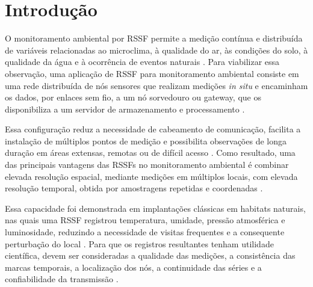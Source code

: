 \section{Introdução}
\label{sec:introducao}

O monitoramento ambiental por \ac{RSSF} permite a medição contínua e distribuída de variáveis relacionadas ao microclima, à qualidade do ar, às condições do solo, à qualidade da água e à ocorrência de eventos naturais \cite{HART2006177}.
Para viabilizar essa observação, uma aplicação de \ac{RSSF} para monitoramento ambiental consiste em uma rede distribuída de nós sensores que realizam medições \textit{in situ} e encaminham os dados, por enlaces sem fio, a um nó sorvedouro ou gateway, que os disponibiliza a um servidor de armazenamento e processamento \cite{5597912,AKYILDIZ2002393}.

Essa configuração reduz a necessidade de cabeamento de comunicação, facilita a instalação de múltiplos pontos de medição e possibilita observações de longa duração em áreas extensas, remotas ou de difícil acesso \cite{HART2006177,5597912}.
Como resultado, uma das principais vantagens das \acp{RSSF} no monitoramento ambiental é combinar elevada resolução espacial, mediante medições em múltiplos locais, com elevada resolução temporal, obtida por amostragens repetidas e coordenadas \cite{HART2006177,5597912}.

Essa capacidade foi demonstrada em implantações clássicas em habitats naturais, nas quais uma \ac{RSSF} registrou temperatura, umidade, pressão atmosférica e luminosidade, reduzindo a necessidade de visitas frequentes e a consequente perturbação do local \cite{10.1145/570738.570751}.
Para que os registros resultantes tenham utilidade científica, devem ser consideradas a qualidade das medições, a consistência das marcas temporais, a localização dos nós, a continuidade das séries e a confiabilidade da transmissão \cite{5597912,YICK20082292,10.1145/1031495.1031521}.